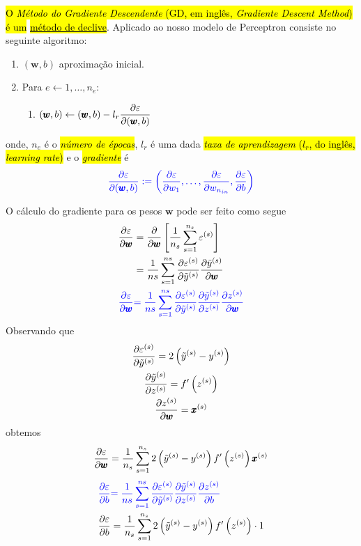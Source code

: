 \hl{O \emph{Método do Gradiente Descendente} (GD, em inglês, \textit{Gradiente Descent Method}) é um }\href{https://notaspedrok.com.br/notas/MatematicaNumericaAvancada/cap_otimizacao_sec_minimi.html}{\hl{método de declive}}. Aplicado ao nosso modelo de Perceptron consiste no seguinte algoritmo:
\begin{enumerate}
\item $(\pmb{w}, b)$ aproximação inicial.
\item Para $e\leftarrow 1, \dotsc, n_e$:
  \begin{enumerate}
  \item $\displaystyle (\pmb{w}, b) \leftarrow (\pmb{w}, b) - l_r\frac{\partial\varepsilon}{\partial (\pmb{w}, b)}$
  \end{enumerate}
\end{enumerate}
onde, $n_e$ é o \hl{\emph{número de épocas}}, $l_r$ é uma dada \hl{\emph{taxa de aprendizagem} ($l_r$, do inglês, \textit{learning rate})} e o \hl{\emph{gradiente}} é
\begin{equation}\color{blue}\frac{\partial\varepsilon}{\partial (\pmb{w}, b)} := \left(\frac{\partial\varepsilon}{\partial w_1}, \dotsc, \frac{\partial\varepsilon}{\partial w_{n_{in}}}, \frac{\partial\varepsilon}{\partial b}\right)
\end{equation}

O cálculo do gradiente para os pesos $\pmb{w}$ pode ser feito como segue
\begin{align}
  \frac{\partial\varepsilon}{\partial \pmb{w}} &= \frac{\partial}{\partial\pmb{w}}\left[\frac{1}{n_s}\sum_{s=1}^{n_s}\varepsilon^{(s)}\right]\\
                                   &= \frac{1}{ns}\sum_{s=1}^{ns}\frac{\partial\varepsilon^{(s)}}{\partial\tilde{y}^{(s)}}\frac{\partial\tilde{y}^{(s)}}{\partial\pmb{w}}\\
  {\color{blue}\frac{\partial\varepsilon}{\partial \pmb{w}}} &{\color{blue}= \frac{1}{ns}\sum_{s=1}^{ns}\frac{\partial\varepsilon^{(s)}}{\partial\tilde{y}^{(s)}}\frac{\partial\tilde{y}^{(s)}}{\partial z^{(s)}}\frac{\partial z^{(s)}}{\partial\pmb{w}}}
\end{align}
Observando que
\begin{gather}
  \frac{\partial\varepsilon^{(s)}}{\partial\tilde{y}^{(s)}} = 2\left(\tilde{y}^{(s)} - y^{(s)}\right)\\
  \frac{\partial\tilde{y}^{(s)}}{\partial z^{(s)}} = f'\left(z^{(s)}\right)\\
  \frac{\partial z^{(s)}}{\partial\pmb{w}} = \pmb{x}^{(s)}
\end{gather}
obtemos
\begin{equation}
  \frac{\partial\varepsilon}{\partial \pmb{w}} = \frac{1}{n_s}\sum_{s=1}^{n_s}2\left(\tilde{y}^{(s)}-y^{(s)}\right)f'\left(z^{(s)}\right)\pmb{x}^{(s)}
\end{equation}
\begin{align}
  {\color{blue}\frac{\partial\varepsilon}{\partial b}} &{\color{blue}= \frac{1}{ns}\sum_{s=1}^{ns}\frac{\partial\varepsilon^{(s)}}{\partial\tilde{y}^{(s)}}\frac{\partial\tilde{y}^{(s)}}{\partial z^{(s)}}\frac{\partial z^{(s)}}{\partial b}}\\
  \frac{\partial\varepsilon}{\partial b} &= \frac{1}{n_s}\sum_{s=1}^{n_s}2\left(\tilde{y}^{(s)}-y^{(s)}\right)f'\left(z^{(s)}\right)\cdot 1
\end{align}

